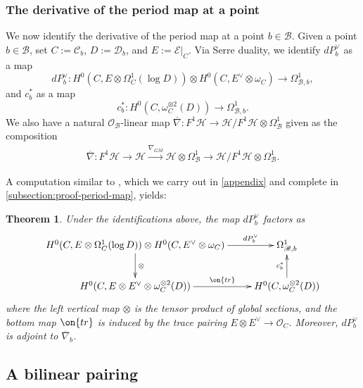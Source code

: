 \documentclass[12 pt]{amsart}
\theoremstyle{plain}
\newtheorem{theorem}[subsubsection]{Theorem}
\theoremstyle{definition}
\theoremstyle{remark}
\numberwithin{equation}{section}
\begin{document}
\subsubsection{The derivative of the period map at a point}
\label{subsubsection:derivative-period-map}

We now identify the derivative of the period map at a point $b \in \mathscr B$.
Given a point $b\in \mathscr{B}$, set $C:=\mathscr{C}_b$,
$D:=\mathscr{D}_b$, and $E:=\mathscr{E}|_C$. Via Serre duality, we identify $dP^\vee_b$ as a map $$dP^\vee_b: H^0(C, {E}\otimes \Omega^1_C(\log D))\otimes H^0(C, {E}^\vee \otimes \omega_C)\to \Omega^1_{\mathscr{B},b},$$ and $c^*_b$ as a map $$c^*_b: H^0(C, \omega_C^{\otimes 2}(D))\to \Omega^1_{\mathscr{B}, b}.$$
We also have a natural $\mathscr{O}_\mathscr{B}$-linear map $\overline{\nabla}: F^1 \mathscr H \to \mathscr H/F^1 \mathscr H \otimes
\Omega^1_{\mathscr B}$ given as the composition
\begin{align}
	\label{equation:shift-derivative}
	\overline{\nabla}: F^1 \mathscr H \to \mathscr H \xrightarrow{\nabla_{GM}} \mathscr H \otimes
	\Omega^1_{\mathscr B} \to \mathscr H/F^1 \mathscr H \otimes
	\Omega^1_{\mathscr B}.
\end{align}

A computation similar to
\cite[Lemma 10.19, Theorem 10.21, and Lemma 10.22]{Voisin:hodgeTheory},
which we carry out in 
\autoref{appendix} and complete in
\autoref{subsection:proof-period-map},
yields:
\begin{theorem}\label{theorem:period-map-computation}
	Under the identifications above, the map $dP^\vee_b$ factors as 
	\begin{equation}
	\xymatrix{
	H^0(C, {E}\otimes \Omega^1_C(\log D))\otimes H^0(C, {E}^\vee \otimes \omega_C) \ar[r]^-{dP^\vee_b}  \ar[d]^{\otimes} & \Omega^1_{\mathscr{B},b}\\
	H^0(C, {E}\otimes {E}^\vee \otimes \omega_C^{\otimes 2}(D)) \ar[r]^-{\on{tr}} & H^0(C, \omega_C^{\otimes 2}(D)) \ar[u]^{c^*_b}
	}
		\label{equation:multiplication-to-period}
	\end{equation}
where the left vertical map $\otimes$ is the tensor product of global sections, and the bottom map $\on{tr}$ is induced by the trace pairing ${E}\otimes {E}^\vee\to \mathscr{O}_C$.
	Moreover, $dP^\vee_b$ is adjoint to $\overline \nabla_b$.
\end{theorem}

\subsection{A bilinear pairing}\label{subsection:bilinear-pairing}
\end{document}

